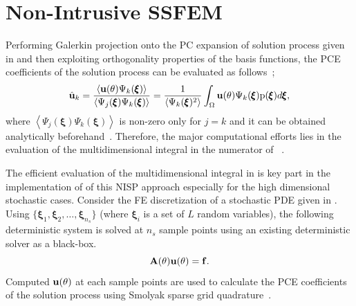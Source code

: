 \documentclass[letter,1p,11pt,oneside,onecolumn,sort&compress]{elsarticle}
\begin{document}
\section{Non-Intrusive SSFEM}\label{apn:nisp}
Performing Galerkin projection onto the PC expansion of solution process given in  and then exploiting orthogonality properties of the basis functions, the PCE coefficients of the solution process can be evaluated as follows~\cite{ghanemSFEM1991,le2010spectral,xiu2009fast};
\begin{equation}
{\mathrm{\hat{\bf{u}}}_k}   = \frac{\left< {\mathrm{\bf{u}(\theta)}} {\Psi_k({\pmb{\xi}})}  \right>} {\left< {\Psi_j({\pmb{\xi}})} {\Psi_k({\pmb{\xi}})}  \right>} = \frac{1} {\left<{\Psi_k({\pmb{\xi}})^{2}}  \right>} \int_{\Omega} {\mathrm{\bf{u}(\theta)}} {\Psi_k({\pmb{\xi}})} {\mathrm{p}}(\pmb{\xi}) {d{\pmb{\xi}}},
\label{eq:apn_NISPpce}
\end{equation}
where $\left< {\Psi_j({\pmb{\xi}})} {\Psi_k({\pmb{\xi}})}  \right>$ is non-zero only for $j=k$ and it can be obtained analytically beforehand~\cite{smith2013uncertainty,desai2019scalable}.
Therefore, the major computational efforts lies in the evaluation of the multidimensional integral in the numerator of ~\cite{le2010spectral,reagana2003uncertainty,hosder2006non,ganapathysubramanian2007sparse,nobile2008sparse}.

The efficient evaluation of the multidimensional integral in  is key part in the implementation of of this NISP approach especially for the high dimensional stochastic cases.
Consider the FE discretization of a stochastic PDE given in . Using $\{ \pmb{\xi}_{1} ,  \pmb{\xi}_{2} , \dots, \pmb{\xi}_{n_{s}}  \}$ (where $\pmb{\xi}_i$ is a set of $L$ random variables), the following deterministic system is solved at $n_{s}$ sample points using an existing deterministic solver as a black-box.
\begin{equation}\label{eq:apn_nispSamp}
{\mathrm{\bf{A}(\theta)  \bf{u}(\theta) = \bf{f}}}.
\end{equation}
Computed $\bf{u}(\theta)$ at each sample points are used to calculate the PCE coefficients of the solution process using Smolyak sparse grid quadrature~\cite{le2010spectral,hosder2006non,ganapathysubramanian2007sparse,nobile2008sparse,eldred2009recent,debusschere2013uqtk}.
\end{document}
